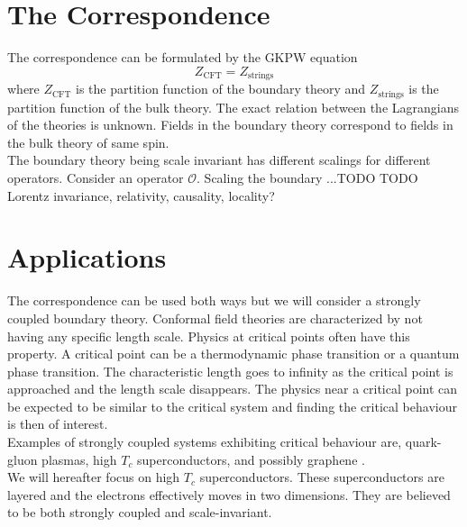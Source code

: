 \documentclass[12pt]{report}
\begin{document}

\section{The Correspondence\label{correspondence}}
The correspondence can be formulated by the GKPW equation \cite{Witten:1998qj}
\begin{equation}
 Z_{\text{CFT}}=Z_{\text{strings}}
\label{GKPW}
\end{equation}
where $Z_{\text{CFT}}$ is the partition function of the boundary theory and $Z_{\text{strings}}$ is the partition function of the bulk theory. The exact relation between the Lagrangians of the theories is unknown. Fields in the boundary theory correspond to fields in the bulk theory of same spin.\\
The boundary theory being scale invariant has different scalings for different operators. Consider an operator $\mathcal{O}$. Scaling the boundary ...TODO
TODO
Lorentz invariance, relativity, causality, locality?
\section{Applications}
The correspondence can be used both ways but we will consider a strongly coupled boundary theory. Conformal field theories are characterized by not having any specific length scale. Physics at critical points often have this property. A critical point can be a thermodynamic phase transition or a quantum phase transition. The characteristic length goes to infinity as the critical point is approached and the length scale disappears. The physics near a critical point can be expected to be similar to the critical system and finding the critical behaviour is then of interest.\\

Examples of strongly coupled systems exhibiting critical behaviour are, quark-gluon plasmas\cite{PhysRevD.73.045013}, high $T_c$ superconductors\cite{hartnoll8}, and possibly graphene \cite{hartnoll8}.\\

We will hereafter focus on high $T_c$ superconductors. These superconductors are layered and the electrons effectively moves in two dimensions. They are believed to be both strongly coupled and scale-invariant\cite{hartnoll8}.
\end{document}
